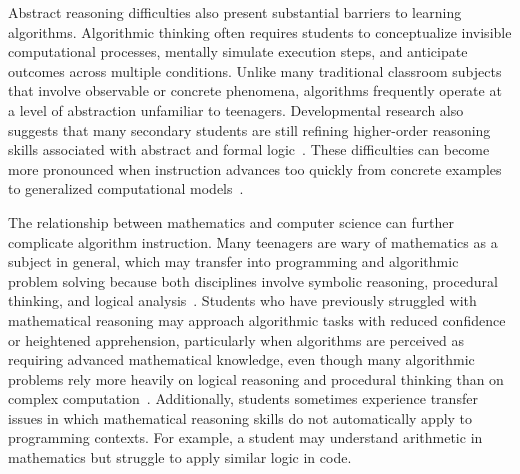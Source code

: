 \documentclass[../main.tex]{subfiles}
\begin{document}
Abstract reasoning difficulties also present substantial barriers to learning algorithms.
Algorithmic thinking often requires students to conceptualize invisible computational processes, mentally simulate execution steps, and anticipate
  outcomes across multiple conditions.
Unlike many traditional classroom subjects that involve observable or concrete phenomena, algorithms frequently operate at a level of abstraction
  unfamiliar to teenagers.
Developmental research also suggests that many secondary students are still refining higher-order reasoning skills associated with abstract and
  formal logic~\cite{fitrianna2025adolescent}.
These difficulties can become more pronounced when instruction advances too quickly from concrete examples to generalized computational
  models~\cite{grover2017assessing}.

The relationship between mathematics and computer science can further complicate algorithm instruction.
Many teenagers are wary of mathematics as a subject in general, which may transfer into programming and algorithmic problem solving because both
  disciplines involve symbolic reasoning, procedural thinking, and logical analysis~\cite{khoche12024mathematical}.
Students who have previously struggled with mathematical reasoning may approach algorithmic tasks with reduced confidence or heightened apprehension,
  particularly when algorithms are perceived as requiring advanced mathematical knowledge, even though many algorithmic problems rely more heavily on
  logical reasoning and procedural thinking than on complex computation~\cite{Voog2012}\cite{grover2017assessing}.
Additionally, students sometimes experience transfer issues in which mathematical reasoning skills do not automatically apply to programming
  contexts.
For example, a student may understand arithmetic in mathematics but struggle to apply similar logic in code.
\end{document}
